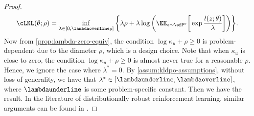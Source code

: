 \begin{proof}
    \begin{equation*}
        \cLKL(\theta;\rho) = \inf_{\lambda\in[0,\lambdaoverline_\theta]}\bigg\{\lambda\rho + \lambda\log\bigg(\EE_{z\sim\sfP^o}\bigg[ \exp{\frac{l(z;\theta)}{\lambda}}\bigg]\bigg)\bigg\}.
    \end{equation*}
    Now from \cref{prop:lambda-zero-equiv}, the condition $\log\kappa_u + \rho\geq 0$ is problem-dependent due to the diameter $\rho$, which is a design choice. Note that when $\kappa_u$ is close to zero, the condition $\log\kappa_u + \rho\geq 0$ is almost never true for a reasonable $\rho$. Hence, we ignore the case where $\lambda^*=0$. By \cref{assum:kldpo-assumptions}, without loss of generality, we have that $\lambda^*\in [\lambdaunderline,\lambdaoverline]$, where $\lambdaunderline$ is some problem-specific constant. Then we have the result. In the literature of distributionally robust reinforcement learning, similar arguments can be found in \citet{zhou2021finite,panaganti22a}.
\end{proof}



